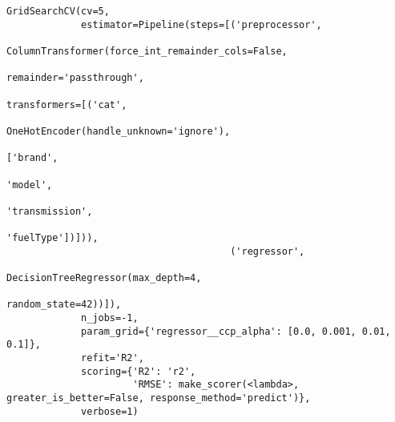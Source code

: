 \documentclass[
  letterpaper,
  DIV=11,
  numbers=noendperiod]{scrreprt}
\begin{document}
\begin{verbatim}
GridSearchCV(cv=5,
             estimator=Pipeline(steps=[('preprocessor',
                                        ColumnTransformer(force_int_remainder_cols=False,
                                                          remainder='passthrough',
                                                          transformers=[('cat',
                                                                         OneHotEncoder(handle_unknown='ignore'),
                                                                         ['brand',
                                                                          'model',
                                                                          'transmission',
                                                                          'fuelType'])])),
                                       ('regressor',
                                        DecisionTreeRegressor(max_depth=4,
                                                              random_state=42))]),
             n_jobs=-1,
             param_grid={'regressor__ccp_alpha': [0.0, 0.001, 0.01, 0.1]},
             refit='R2',
             scoring={'R2': 'r2',
                      'RMSE': make_scorer(<lambda>, greater_is_better=False, response_method='predict')},
             verbose=1)
\end{verbatim}
\end{document}
